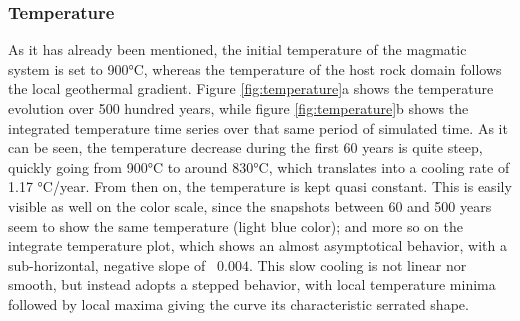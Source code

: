 \subsubsection{Temperature}
As it has already been mentioned, the initial temperature of the magmatic system is set to 900°C, whereas the temperature of the host rock domain follows the local geothermal gradient. 
Figure \ref{fig:temperature}a shows the temperature evolution over 500 hundred years, while figure \ref{fig:temperature}b shows the integrated temperature time series over that same period of simulated time. As it can be seen, the temperature decrease during the first 60 years is quite steep, quickly going from 900°C to around 830°C, which translates into a cooling rate of 1.17 °C/year. From then on, the temperature is kept quasi constant. This is easily visible as well on the color scale, since the snapshots between 60 and 500 years seem to show the same temperature (light blue color); and more so on the integrate temperature plot, which shows an almost asymptotical behavior, with a sub-horizontal, negative slope of ~$0.004$. This slow cooling is not linear nor smooth, but instead adopts a stepped behavior, with local temperature minima followed by local maxima giving the curve its characteristic serrated shape.



